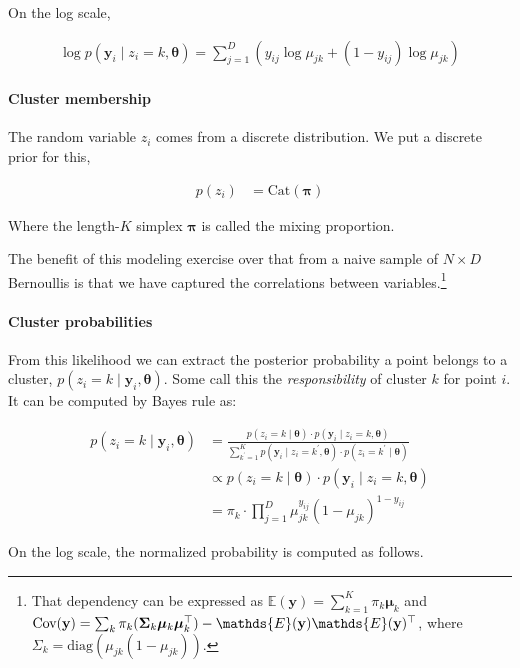 \documentclass[12pt,letterpaper]{article}
\newcommand{\cov}{\textnormal{Cov}}
\newcommand{\bth}{\bm{\theta}}
\newcommand{\bmu}{\bm{\mu}}
\newcommand{\bpi}{\bm{\pi}}
\newcommand{\by}{\mathbf{y}}
\begin{document}
On the log scale,

\begin{align}
\log p(\by_{i} \mid z_{i} = k, \bth) = \sum_{j=1}^{D}(y_{ij}\log\mu_{jk} + (1 - y_{ij})\log\mu_{jk})
\end{align}

\paragraph{Cluster membership}

The random variable \(z_i\) comes from a discrete distribution. We put a
discrete prior for this,

\begin{align}
p(z_i) &= \text{Cat}(\bpi)
\end{align}

Where the length-\(K\) simplex \(\bpi\) is called the mixing proportion.

The benefit of this modeling exercise over that from a naive sample of
\(N \times D\) Bernoullis is that we have captured the correlations
between
variables.\footnote{That dependency can be expressed as \(\mathds{E}(\by) = \sum_{k = 1}^{K} \pi_{k} \bmu_{k}\) and 
\(\cov({\by}) = \sum_{k} \pi_{k} (\mathbf{\Sigma}_k \bmu_k\bmu_{k}^{\top}) - \mathds{E}(\by)\mathds{E}(\by)^\top\), where \(\Sigma_k = \text{diag}(\mu_{jk}(1 - \mu_{jk}))\).}

\paragraph{Cluster probabilities}

From this likelihood we can extract the posterior probability a point
belongs to a cluster, \(p(z_i = k \mid \by_i, \bth)\). Some call this
the \emph{responsibility} of cluster \(k\) for point \(i\). It can be
computed by Bayes rule as:

\begin{align}
p(z_i = k \mid \by_{i}, \bth) &=  \frac{p(z_i = k \mid \bth)\cdot p(\by_{i} \mid z_i = k, \bth)}{\sum^{K}_{k^\prime = 1} p(\by_{i} \mid z_i = k^\prime, \bth) \cdot p(z_i = k^\prime \mid \bth)}\\
&\propto p(z_i = k \mid \bth)\cdot p(\by_{i} \mid z_i = k, \bth)\\
&=  \pi_k\cdot\prod^{D}_{j=1}\mu_{jk}^{y_{ij}}(1 - \mu_{jk})^{1 - y_{ij}}
\end{align}

On the log scale, the normalized probability is computed as follows.
\end{document}

